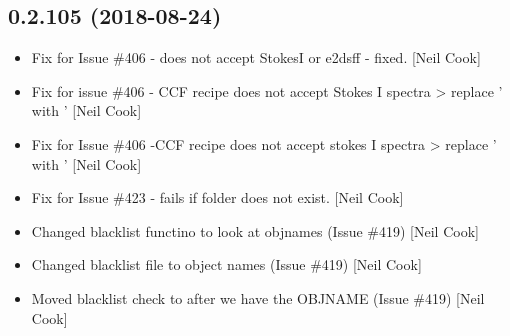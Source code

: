 \documentclass[a4paper,10pt,english]{report}
\begin{document}
\subsection{0.2.105 (2018-08-24)}
\label{\detokenize{misc/changelog:id353}}\begin{itemize}
\item {} 
Fix for Issue \#406 -  does not accept StokesI or e2dsff -
fixed. {[}Neil Cook{]}

\item {} 
Fix for issue \#406 - CCF recipe does not accept Stokes I spectra \textendash{}\textgreater{}
replace ’ with ’ {[}Neil Cook{]}

\item {} 
Fix for Issue \#406 -CCF recipe does not accept stokes I spectra \textendash{}\textgreater{}
replace ’ with ’ {[}Neil Cook{]}

\item {} 
Fix for Issue \#423 -  fails if folder does not exist. {[}Neil
Cook{]}

\item {} 
Changed blacklist functino to look at objnames (Issue \#419) {[}Neil
Cook{]}

\item {} 
Changed blacklist file to object names (Issue \#419) {[}Neil Cook{]}

\item {} 
Moved blacklist check to after we have the OBJNAME (Issue \#419) {[}Neil
Cook{]}

\end{itemize}
\end{document}
